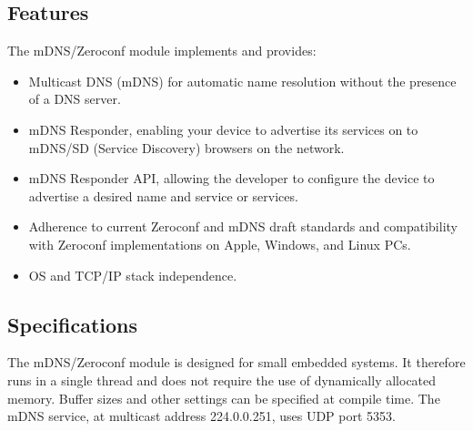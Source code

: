 \documentclass[11pt,titlepage]{article}
\begin{document}
\subsection{Features}

The mDNS/Zeroconf module implements and provides:

\begin{itemize}
	\item Multicast DNS (mDNS) for automatic name resolution without the
		  presence of a DNS server.
	\item mDNS Responder, enabling your device to advertise its services on
		  to mDNS/SD (Service Discovery) browsers on the network.
	\item mDNS Responder API, allowing the developer to configure the device
		  to advertise a desired name and service or services.
	\item Adherence to current Zeroconf and mDNS draft standards and 
		  compatibility with Zeroconf implementations on Apple, Windows, and
		  Linux PCs.
	\item OS and TCP/IP stack independence.
\end{itemize}

\subsection{Specifications}

The mDNS/Zeroconf module is designed for small embedded systems.  It therefore
runs in a single thread and does not require the use of dynamically allocated 
memory.  Buffer sizes and other settings can be specified at compile time. The 
mDNS service, at multicast address 224.0.0.251, uses UDP port 5353.
\end{document}
